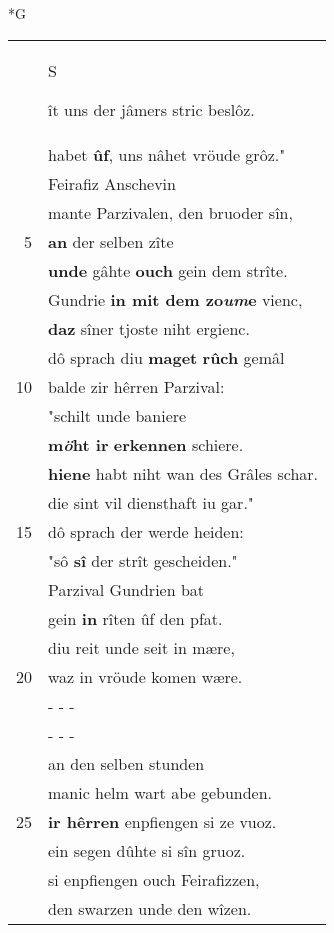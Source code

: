 \documentclass[8pt,a4paper,notitlepage]{article}
\begin{document}
\begin{table}[ht]
\begin{minipage}[t]{0.5\linewidth}
\small
\begin{center}*G
\end{center}
\begin{tabular}{rl}
 & \begin{large}S\end{large}ît uns der jâmers stric beslôz.\\ 
 & habet \textbf{ûf}, uns nâhet vröude grôz."\\ 
 & Feirafiz Anschevin\\ 
 & mante Parzivalen, den bruoder sîn,\\ 
5 & \textbf{an} der selben zîte\\ 
 & \textbf{unde} gâhte \textbf{ouch} gein dem strîte.\\ 
 & Gundrie \textbf{in mit dem zo\textit{um}e} vienc,\\ 
 & \textbf{daz} sîner tjoste niht ergienc.\\ 
 & dô sprach diu \textbf{maget} \textbf{rûch} gemâl\\ 
10 & balde zir hêrren Parzival:\\ 
 & "schilt unde baniere\\ 
 & \textbf{m\textit{ö}ht ir} \textbf{erkennen} schiere.\\ 
 & \textbf{hie}\textbf{ne} habt niht wan des Grâles schar.\\ 
 & die sint vil diensthaft iu gar."\\ 
15 & dô sprach der werde heiden:\\ 
 & "sô \textbf{sî} der strît gescheiden."\\ 
 & Parzival Gundrien bat\\ 
 & gein \textbf{in} rîten ûf den pfat.\\ 
 & diu reit unde seit in mære,\\ 
20 & waz in vröude komen wære.\\ 
 & \multicolumn{1}{l}{ - - - }\\ 
 & \multicolumn{1}{l}{ - - - }\\ 
 & an den selben stunden\\ 
 & manic helm wart abe gebunden.\\ 
25 & \textbf{ir hêrren} enpfiengen si ze vuoz.\\ 
 & ein segen dûhte si sîn gruoz.\\ 
 & si enpfiengen ouch Feirafizzen,\\ 
 & den swarzen unde den wîzen.\\ 

\end{tabular}
\end{minipage}
\end{table}
\end{document}
